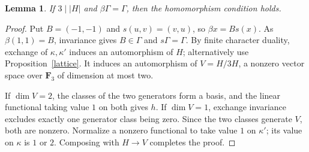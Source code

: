 \documentclass[11pt]{article}
\newtheorem{lemma}[theorem]{Lemma}
\theoremstyle{remark}\newtheorem{remark}[theorem]{Remark}
\newcommand{\Fthree}{\mathbf F_3}
\begin{document}
\begin{lemma}\label{beta3h}
If $3\mid|H|$ and $\beta\Gamma=\Gamma$, then the homomorphism condition holds.
\end{lemma}
\begin{proof}
Put $B=(-1,-1)$ and $s(u,v)=(v,u)$, so $\beta x=B s(x)$. As $\beta(1,1)=B$, invariance gives $B\in\Gamma$ and $s\Gamma=\Gamma$. By finite character duality, exchange of $\kappa,\kappa'$ induces an automorphism of $H$; alternatively use Proposition~\ref{lattice}. It induces an automorphism of $V=H/3H$, a nonzero vector space over $\Fthree$ of dimension at most two.

If $\dim V=2$, the classes of the two generators form a basis, and the linear functional taking value $1$ on both gives $h$. If $\dim V=1$, exchange invariance excludes exactly one generator class being zero. Since the two classes generate $V$, both are nonzero. Normalize a nonzero functional to take value $1$ on $\kappa'$; its value on $\kappa$ is $1$ or $2$. Composing with $H\to V$ completes the proof.
\end{proof}
\end{document}
